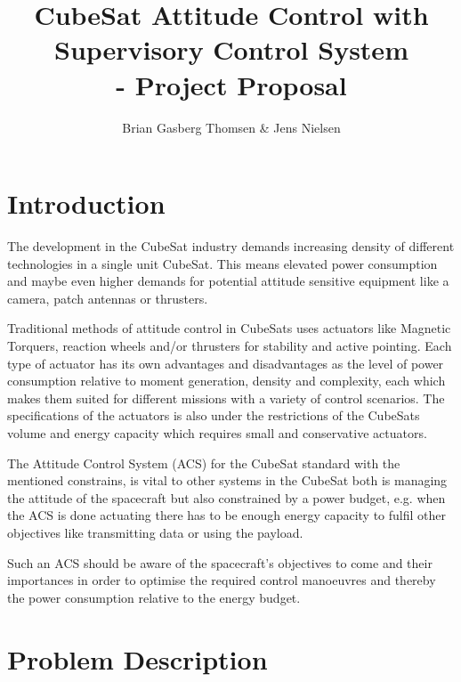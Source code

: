 \documentclass[10pt,a4paper,oneside,openany,article]{memoir}
\title{\vspace{-2cm} CubeSat Attitude Control with Supervisory Control System \\ \Large - Project Proposal}
\author{Brian Gasberg Thomsen \& Jens Nielsen}
\begin{document}
\maketitle

\chapter{Introduction}
The development in the CubeSat industry demands increasing density of different technologies in a single unit CubeSat. This means elevated power consumption and maybe even higher demands for potential attitude sensitive equipment like a camera, patch antennas or thrusters. 

Traditional methods of attitude control in CubeSats uses actuators like Magnetic Torquers, reaction wheels and/or thrusters for stability and active pointing. Each type of actuator has its own advantages and disadvantages as the level of power consumption relative to moment generation, density and complexity, each which makes them suited for different missions with a variety of control scenarios. The specifications of the actuators is also under the restrictions of the CubeSats volume and energy capacity which requires small and conservative actuators.

The Attitude Control System (ACS) for the CubeSat standard with the mentioned constrains, is vital to other systems in the CubeSat both is managing the attitude of the spacecraft but also constrained by a power budget, e.g. when the ACS is done actuating there has to be enough energy capacity to fulfil other objectives like transmitting data or using the payload.

Such an ACS should be aware of the spacecraft's objectives to come and their importances in order to optimise the required control manoeuvres and thereby the power consumption relative to the energy budget.

\chapter{Problem Description}

\end{document}
